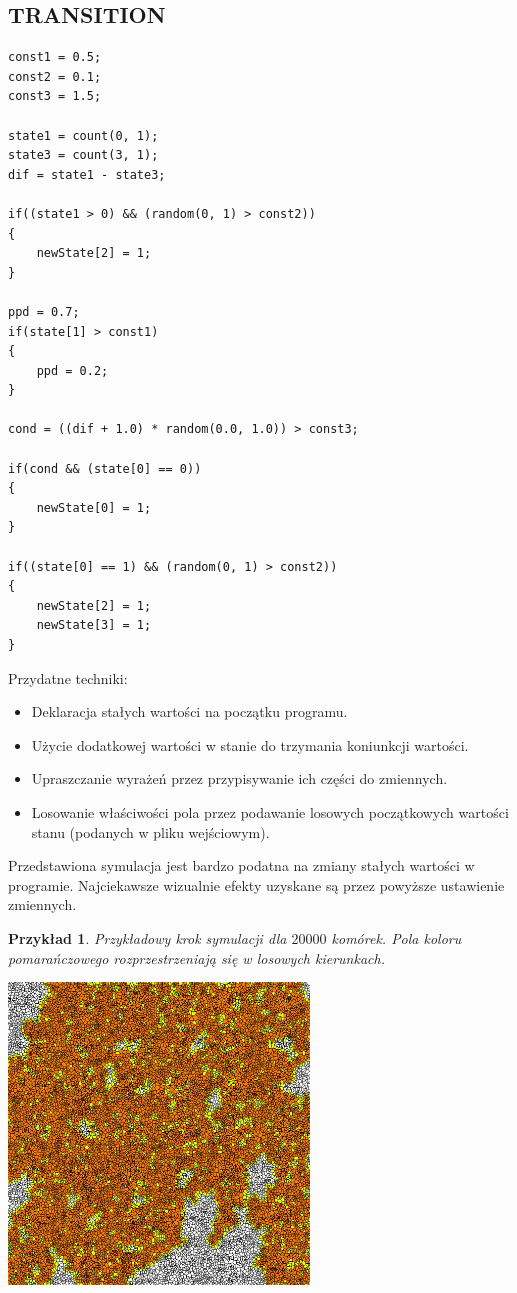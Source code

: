 \documentclass[declaration,shortabstract, inz]{iithesis}
\theoremstyle{definition} \newtheorem{definition}{Definicja}[]
\theoremstyle{plain} \newtheorem{remark}[definition]{Obserwacja}
\theoremstyle{plain} \newtheorem{theorem}[definition]{Twierdzenie}
\theoremstyle{plain} \newtheorem{example}{Przykład}[definition]
\theoremstyle{plain} \newtheorem{lemma}[definition]{Lemat}
\begin{document}
\subsection{TRANSITION}
\begin{center}
\begin{lstlisting}
const1 = 0.5;
const2 = 0.1;
const3 = 1.5; 
 
state1 = count(0, 1);
state3 = count(3, 1);
dif = state1 - state3;
 
if((state1 > 0) && (random(0, 1) > const2))
{
    newState[2] = 1;
}
 
ppd = 0.7;
if(state[1] > const1)
{
    ppd = 0.2;
}
 
cond = ((dif + 1.0) * random(0.0, 1.0)) > const3;
 
if(cond && (state[0] == 0))
{
    newState[0] = 1;
}
 
if((state[0] == 1) && (random(0, 1) > const2))
{
    newState[2] = 1;
    newState[3] = 1;
}
\end{lstlisting}
\end{center}

Przydatne techniki:
\begin{itemize}
\item  Deklaracja stałych wartości na początku programu.
\item Użycie dodatkowej wartości w stanie do trzymania koniunkcji wartości.
\item Upraszczanie wyrażeń przez przypisywanie ich części do zmiennych.
\item Losowanie właściwości pola przez podawanie losowych początkowych wartości stanu (podanych w pliku wejściowym).
\end{itemize}

Przedstawiona symulacja jest bardzo podatna na zmiany stałych wartości w programie. Najciekawsze wizualnie efekty uzyskane są przez powyższe ustawienie zmiennych.

\begin{example}
Przykładowy krok symulacji dla $20000$ komórek. Pola koloru pomarańczowego rozprzestrzeniają się w losowych kierunkach.
	\begin{center}
		\includegraphics[width=0.6\textwidth]{sim3}
	\end{center}
\end{example}
\end{document}
